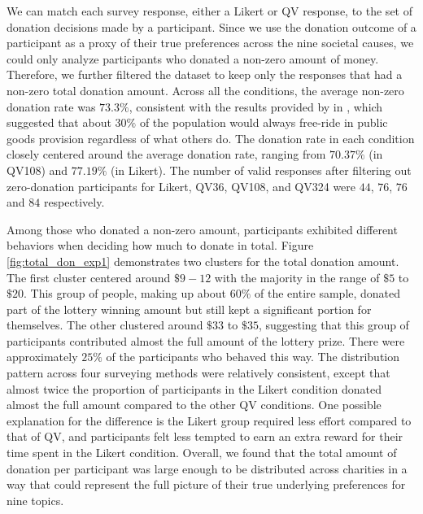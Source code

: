 We can match each survey response, 
either a Likert or QV response,
to the set of donation decisions
made by a participant.
Since we use the donation outcome of a participant 
as a proxy of their true preferences 
across the nine societal causes, 
we could only analyze
participants who donated a non-zero amount of money.
Therefore, we further filtered the dataset 
to keep only the responses 
that had a non-zero total donation amount.
Across all the conditions, 
the average non-zero donation rate was $73.3\%$,
consistent with the results provided by \textcite{fehr2007human} in \citeyear{fehr2007human},
which suggested that about $30\%$ of the population 
would always free-ride in public goods provision 
regardless of what others do. 
The donation rate in each condition 
closely centered around the average donation rate, 
ranging from $70.37\%$ (in QV108) and $77.19\%$ (in Likert).
The number of valid responses after filtering out zero-donation participants for
Likert, QV36, QV108, and QV324 were $44$, $76$, $76$ and $84$ respectively.

Among those who donated a non-zero amount,
participants exhibited different behaviors
when deciding how much to donate in total. 
Figure \ref{fig:total_don_exp1} demonstrates
two clusters for the total donation amount. 
The first cluster centered around $\$9-12$
with the majority in the range of $\$5$ to $\$20$. 
This group of people,
making up about $60\%$ of the entire sample, 
donated part of the lottery winning amount
but still kept a significant portion for themselves.
The other clustered around $\$33$ to $\$35$, 
suggesting that this group of participants
contributed almost the full amount of the lottery prize. 
There were approximately $25\%$ of the participants who behaved this way. 
The distribution pattern across 
four surveying methods were relatively consistent, 
except that almost twice the proportion of participants 
in the Likert condition donated almost the full amount 
compared to the other QV conditions.
One possible explanation for the difference is 
the Likert group required less effort compared to that of QV, 
and participants felt less tempted 
to earn an extra reward for their time spent in the Likert condition. 
Overall, we found that the total amount of donation per participant 
was large enough to be distributed across charities
in a way that could represent the full picture of 
their true underlying preferences for nine topics.

